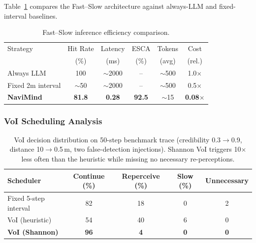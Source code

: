 \documentclass[conference]{IEEEtran}
\begin{document}
Table~\ref{tab:efficiency} compares the Fast--Slow architecture against always-LLM and fixed-interval baselines.

\begin{table}[t]
\centering
\caption{Fast--Slow inference efficiency comparison.}
\label{tab:efficiency}
\footnotesize
\begin{tabular}{@{}lccccc@{}}
\toprule
Strategy & Hit Rate & Latency & ESCA & Tokens & Cost \\
         & (\%)     & (ms)    & (\%) & (avg)  & (rel.) \\
\midrule
Always LLM         & 100 & $\sim$2000 & -- & $\sim$500 & 1.0$\times$ \\
Fixed 2m interval   & $\sim$50 & $\sim$2000 & -- & $\sim$500 & 0.5$\times$ \\
\textbf{NaviMind}   & \textbf{81.8} & \textbf{0.28} & \textbf{92.5} & $\sim$15 & \textbf{0.08}$\times$ \\
\bottomrule
\end{tabular}
\vspace{-2mm}
\end{table}


\subsubsection{VoI Scheduling Analysis}

\begin{table}[t]
\centering
\caption{VoI decision distribution on 50-step benchmark trace (credibility 0.3$\to$0.9,
distance 10$\to$0.5\,m, two false-detection injections).
Shannon VoI triggers 10$\times$ less often than the heuristic while missing no necessary re-perceptions.}
\label{tab:voi}
\footnotesize
\begin{tabular}{@{}lcccc@{}}
\toprule
Scheduler & Continue (\%) & Reperceive (\%) & Slow (\%) & Unnecessary \\
\midrule
Fixed 5-step interval  & 82 & 18 & 0 & 2 \\
VoI (heuristic)        & 54 & 40 & 6 & 0 \\
\textbf{VoI (Shannon)} & \textbf{96} & \textbf{4} & \textbf{0} & \textbf{0} \\
\bottomrule
\end{tabular}
\vspace{-2mm}
\end{table}
\end{document}
